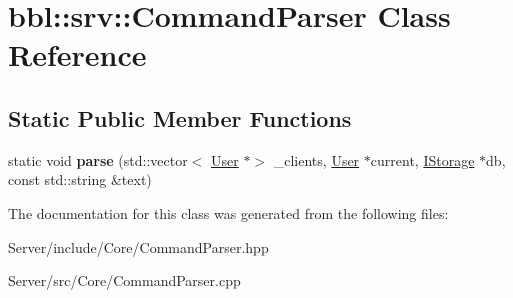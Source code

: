\hypertarget{classbbl_1_1srv_1_1_command_parser}{}\section{bbl\+:\+:srv\+:\+:Command\+Parser Class Reference}
\label{classbbl_1_1srv_1_1_command_parser}
\subsection*{Static Public Member Functions}
\begin{DoxyCompactItemize}
\item 
\mbox{\label{classbbl_1_1srv_1_1_command_parser_ac6860168a27117589bf4fd07a5177e97}} 
static void {\bfseries parse} (std\+::vector$<$ \hyperlink{classbbl_1_1srv_1_1_user}{User} $\ast$$>$ \+\_\+clients, \hyperlink{classbbl_1_1srv_1_1_user}{User} $\ast$current, \hyperlink{classbbl_1_1srv_1_1_i_storage}{I\+Storage} $\ast$db, const std\+::string \&text)
\end{DoxyCompactItemize}


The documentation for this class was generated from the following files\+:\begin{DoxyCompactItemize}
\item 
Server/include/\+Core/Command\+Parser.\+hpp\item 
Server/src/\+Core/Command\+Parser.\+cpp\end{DoxyCompactItemize}
